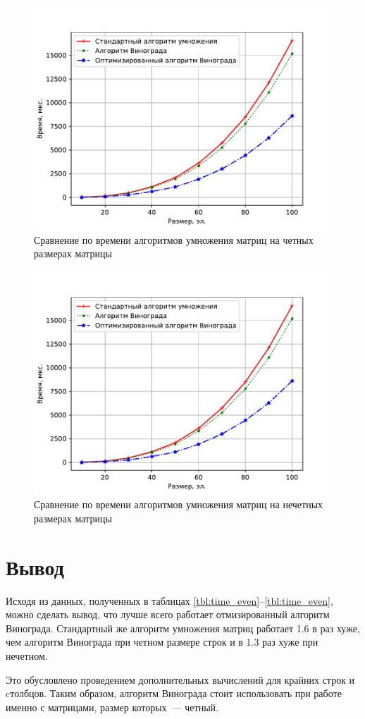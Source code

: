 \begin{figure}[H]
	\centering
	\includegraphics[height=0.4\textheight, page=1]{img/figures.pdf}
	\caption{Сравнение по времени алгоритмов умножения матриц на четных размерах матрицы}
	\label{plt:time_01}
\end{figure}

\begin{figure}[H]
	\centering
	\includegraphics[height=0.4\textheight, page=2]{img/figures.pdf}
	\caption{Сравнение по времени алгоритмов умножения матриц на нечетных размерах матрицы}
	\label{plt:time_02}
\end{figure}

\section*{Вывод}
Исходя из данных, полученных в таблицах \ref{tbl:time_even}--\ref{tbl:time_even}, можно сделать вывод, что лучше всего работает отмизированный алгоритм Винограда.
Стандартный же алгоритм умножения матриц работает 1.6 в раз хуже, чем алгоритм Винограда при четном размере строк и в 1.3 раз хуже при нечетном.

Это обусловлено проведением дополнительных вычислений для крайних строк и cтолбцов. Таким образом, алгоритм Винограда стоит использовать при работе именно с матрицами, размер которых~--- четный.